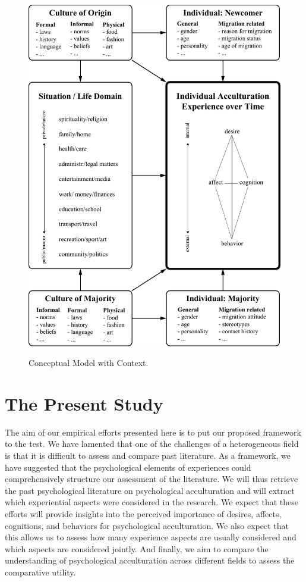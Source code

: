 \documentclass[man, 12pt, a4paper]{apa7}
\newcommand\Warning[1][2ex]{%
  \renewcommand\stacktype{L}%
  \scaleto{\stackon[1.3pt]{\color{red}$\triangle$}{\tiny\bfseries !}}{#1}}%
\begin{document}
\begin{figure}[h]
\centering
\caption{Conceptual Model with Context.}
\includegraphics[width=\textwidth]{Figures/ConceptualFrameworkStatic.pdf}
\label{fig:ModelContext}
\end{figure}

\section{The Present Study}


The aim of our empirical efforts presented here is to put our proposed framework to the test. We have lamented that one of the challenges of a heterogeneous field is that it is difficult to assess and compare past literature. As a framework, we have suggested that the psychological elements of experiences could comprehensively structure our assessment of the literature. We will thus retrieve the past psychological literature on psychological acculturation and will extract which experiential aspects were considered in the research. We expect that these efforts will provide insights into the perceived importance of desires, affects, cognitions, and behaviors for psychological acculturation. We also expect that this allows us to assess how many experience aspects are usually considered and which aspects are considered jointly. And finally, we aim to compare the understanding of psychological acculturation across different fields to assess the comparative utility. 
\end{document}
